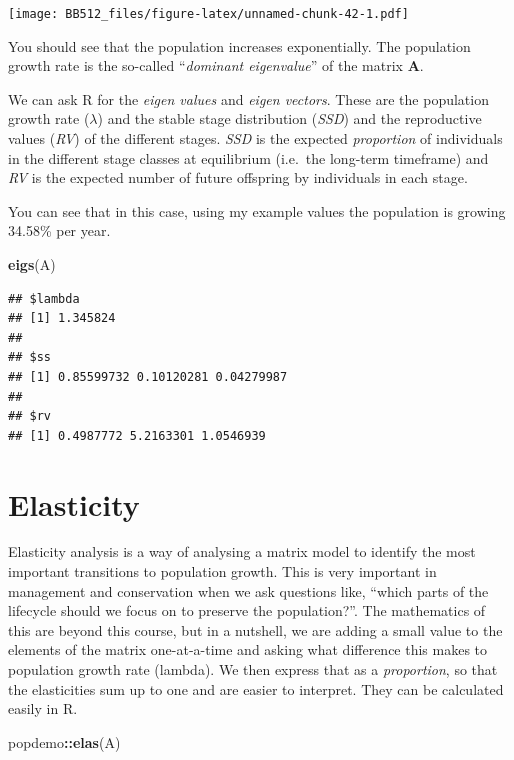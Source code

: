 \documentclass[
  a4paper]{book}
\newenvironment{Shaded}{\begin{snugshade}}{\end{snugshade}}
\newcommand{\FunctionTok}[1]{\textcolor[rgb]{0.13,0.29,0.53}{\textbf{#1}}}
\newcommand{\NormalTok}[1]{#1}
\newcommand{\SpecialCharTok}[1]{\textcolor[rgb]{0.81,0.36,0.00}{\textbf{#1}}}
\begin{document}
\texttt{[image: BB512\_files/figure-latex/unnamed-chunk-42-1.pdf]}

You should see that the population increases exponentially. The population growth rate is the so-called ``\emph{dominant eigenvalue}'' of the matrix \textbf{A}.

We can ask R for the \emph{eigen values} and \emph{eigen vectors}. These are the population growth rate (\(\lambda\)) and the stable stage distribution (\emph{SSD}) and the reproductive values (\emph{RV}) of the different stages. \emph{SSD} is the expected \emph{proportion} of individuals in the different stage classes at equilibrium (i.e.~the long-term timeframe) and \emph{RV} is the expected number of future offspring by individuals in each stage.

You can see that in this case, using my example values the population is growing 34.58\% per year.

\begin{Shaded}
\begin{Highlighting}[]
\FunctionTok{eigs}\NormalTok{(A)}
\end{Highlighting}
\end{Shaded}

\begin{verbatim}
## $lambda
## [1] 1.345824
## 
## $ss
## [1] 0.85599732 0.10120281 0.04279987
## 
## $rv
## [1] 0.4987772 5.2163301 1.0546939
\end{verbatim}

\hypertarget{elasticity}{%
\section{Elasticity}\label{elasticity}}

Elasticity analysis is a way of analysing a matrix model to identify the most important transitions to population growth. This is very important in management and conservation when we ask questions like, ``which parts of the lifecycle should we focus on to preserve the population?''. The mathematics of this are beyond this course, but in a nutshell, we are adding a small value to the elements of the matrix one-at-a-time and asking what difference this makes to population growth rate (lambda). We then express that as a \emph{proportion}, so that the elasticities sum up to one and are easier to interpret. They can be calculated easily in R.

\begin{Shaded}
\begin{Highlighting}[]
\NormalTok{popdemo}\SpecialCharTok{::}\FunctionTok{elas}\NormalTok{(A)}
\end{Highlighting}
\end{Shaded}
\end{document}
